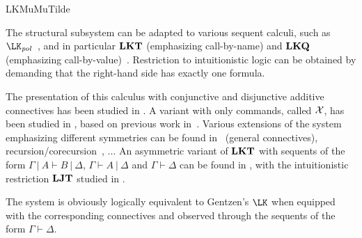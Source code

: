 \begin{entry}{LKMuMuTilde}
\begin{history}
The structural subsystem can be adapted to various sequent calculi,
such as $\LK_{\mathit{pol}}$~\cite{Munch-Maccagnoni09}, and in
particular $\mathbf{LKT}$ (emphasizing call-by-name) and $\mathbf{LKQ}$ (emphasizing
call-by-value)~\cite{DanJoiSch95,DanJoiSch97}. Restriction to
intuitionistic logic can be obtained by demanding that the right-hand
side has exactly one formula.

The presentation of this calculus with conjunctive and disjunctive
additive connectives has been studied in
\cite{Wadler03,Wadler05,HerbelinHdR}. A variant with only commands,
called ${\cal X}$, has been studied in \cite{BakLenLes05}, based on
previous work in~\cite{UrbanPhD}.  Various extensions of the system
emphasizing different symmetries can be found in~\cite{DownenAriola14}
(general connectives), recursion/corecursion~\cite{KimuraTatsuta13},
...  An asymmetric variant of $\mathbf{LKT}$ with sequents of the form $\Gamma
~|~ A \vdash B ~|~ \Delta$, $\Gamma \vdash A ~|~ \Delta$ and $\Gamma
\vdash \Delta$ can be found in \cite{HerbelinPhD}, with the
intuitionistic restriction $\mathbf{LJT}$ studied in \cite{Herbelin94}.

\end{history}

\begin{technicalities}
The system is obviously logically equivalent to Gentzen's $\LK$ when
equipped with the corresponding connectives and observed through the
sequents of the form $\Gamma \vdash \Delta$. 
\end{technicalities}


\end{entry}
